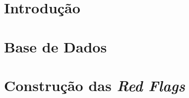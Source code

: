 \documentclass[11pt,openright]{book}
\begin{document}
\chapter{Introdução}

%
%
%
%
%
%
%
\chapter{Base de Dados}

%
%
%
%



\chapter{Construção das \textit{Red Flags}}



%







%	
%	
%	

\nocite{*}












\appendix


%

\blankpage
\newpage


\backmatter



\clearemptydoublepage
\end{document}

